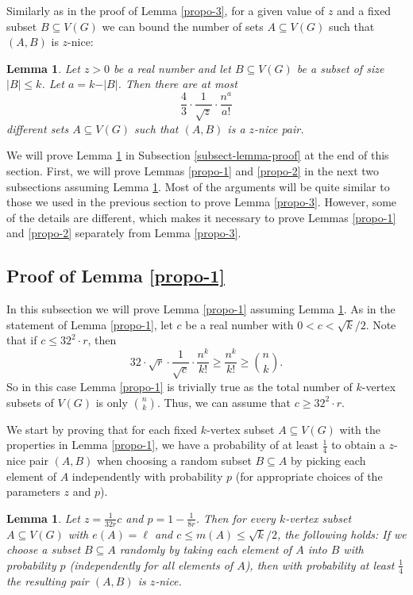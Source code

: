 \documentclass[11pt]{article}
\newtheorem{lemma}[theorem]{Lemma}
\theoremstyle{definition}
\numberwithin{equation}{section}
\begin{document}
Similarly as in the proof of Lemma \ref{propo-3}, for a given value of $z$ and a fixed subset $B\subseteq V(G)$ we can bound the number of sets $A\subseteq V(G)$ such that $(A,B)$ is $z$-nice:

\begin{lemma}\label{lemma-B-nice-bound}Let $z>0$ be a real number and let $B\subseteq V(G)$ be a subset of size $\vert B\vert\leq k$. Let $a=k-\vert B\vert$. Then there are at most 
\[\frac{4}{3}\cdot\frac{1}{\sqrt{z}}\cdot \frac{n^a}{a!}\]
different sets $A\subseteq V(G)$ such that $(A,B)$ is a $z$-nice pair.
\end{lemma}

We will prove Lemma \ref{lemma-B-nice-bound} in Subsection \ref{subsect-lemma-proof} at the end of this section. First, we will prove Lemmas \ref{propo-1} and \ref{propo-2} in the next two subsections assuming Lemma \ref{lemma-B-nice-bound}. Most of the arguments will be quite similar to those we used in the previous section to prove Lemma \ref{propo-3}. However, some of the details are different, which makes it necessary to prove Lemmas \ref{propo-1} and \ref{propo-2} separately from Lemma \ref{propo-3}.

\subsection{Proof of Lemma \ref{propo-1}}

In this subsection we will prove Lemma \ref{propo-1} assuming Lemma \ref{lemma-B-nice-bound}. As in the statement of Lemma \ref{propo-1}, let $c$ be a real number with $0<c<\sqrt{k}/2$. Note that if $c\leq 32^2 \cdot r$, then
\[32\cdot \sqrt{r}\cdot \frac{1}{\sqrt{c}}\cdot \frac{n^k}{k!}\geq \frac{n^k}{k!}\geq {n \choose k}.\]
So in this case Lemma \ref{propo-1} is trivially true as the total number of $k$-vertex subsets of $V(G)$ is only ${n\choose k}$. Thus, we can assume that $c\geq 32^2 \cdot r$.

We start by proving that for each fixed $k$-vertex subset $A\subseteq V(G)$ with the properties in Lemma \ref{propo-1}, we have a probability of at least $\frac{1}{4}$ to obtain a $z$-nice pair $(A,B)$ when choosing a random subset $B\subseteq A$ by picking each element of $A$ independently with probability $p$ (for appropriate choices of the parameters $z$ and $p$).

\begin{lemma}\label{lemma-A-1}Let $z=\frac{1}{32r}c$ and $p=1-\frac{1}{8r}$. Then for every $k$-vertex subset $A\subseteq V(G)$ with $e(A)=\ell$ and $c\leq m(A)\leq \sqrt{k}/2$, the following holds: If we choose a subset $B\subseteq A$ randomly by taking each element of $A$ into $B$ with probability $p$ (independently for all elements of $A$), then with probability at least $\frac{1}{4}$ the resulting pair $(A,B)$ is $z$-nice.
\end{lemma}
\end{document}
